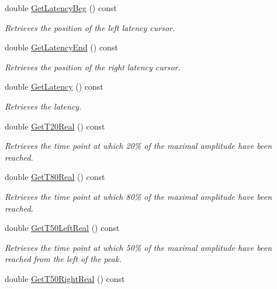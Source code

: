 \begin{DoxyCompactItemize}
double \hyperlink{classRecording_acd1c834b6db0c8c398e4a2b3aa5d18f3}{GetLatencyBeg} () const 
\begin{DoxyCompactList}\small\item\em Retrieves the position of the left latency cursor. \item\end{DoxyCompactList}\item 
double \hyperlink{classRecording_a2022e82ab61364e3e2a68e41bcf616bb}{GetLatencyEnd} () const 
\begin{DoxyCompactList}\small\item\em Retrieves the position of the right latency cursor. \item\end{DoxyCompactList}\item 
double \hyperlink{classRecording_a3d7de67ec49a28bc8797ebeaee4eb35b}{GetLatency} () const 
\begin{DoxyCompactList}\small\item\em Retrieves the latency. \item\end{DoxyCompactList}\item 
double \hyperlink{classRecording_aad7f546bda00fed7c005c64be81a3bf4}{GetT20Real} () const 
\begin{DoxyCompactList}\small\item\em Retrieves the time point at which 20\% of the maximal amplitude have been reached. \item\end{DoxyCompactList}\item 
double \hyperlink{classRecording_ab67e3db7110f63f3a098ec8f75603594}{GetT80Real} () const 
\begin{DoxyCompactList}\small\item\em Retrieves the time point at which 80\% of the maximal amplitude have been reached. \item\end{DoxyCompactList}\item 
double \hyperlink{classRecording_a5798892554031d885319eff5fc72002c}{GetT50LeftReal} () const 
\begin{DoxyCompactList}\small\item\em Retrieves the time point at which 50\% of the maximal amplitude have been reached from the left of the peak. \item\end{DoxyCompactList}\item 
double \hyperlink{classRecording_aa1e0a42814e2e985e38f0a0f43f5dad7}{GetT50RightReal} () const 

\end{DoxyCompactItemize}
